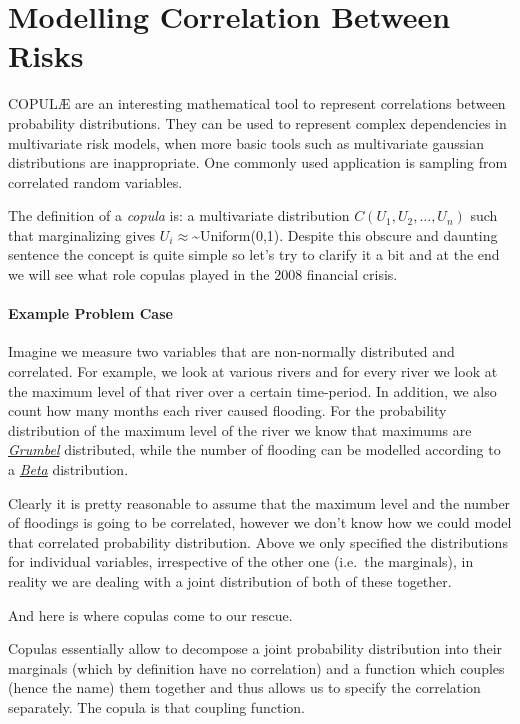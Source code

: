 \chapter{Modelling Correlation Between Risks}

COPULÆ are an interesting mathematical tool to represent correlations between probability distributions. They can be used to represent complex dependencies in multivariate risk models, when more basic tools such as multivariate gaussian distributions are inappropriate. One commonly used application is sampling from correlated random variables.

    The definition of a \emph{copula} is: a multivariate distribution
\(C(U_1, U_2, \ldots, U_n)\) such that marginalizing gives
\(U_i \approx\)\textasciitilde{}Uniform(0,1). Despite this obscure and
daunting sentence the concept is quite simple so let's try to clarify it
a bit and at the end we will see what role copulas played in the 2008
financial crisis.

\hypertarget{example-problem-case}{%
\subsubsection{Example Problem Case}\label{example-problem-case}}

Imagine we measure two variables that are non-normally distributed and
correlated. For example, we look at various rivers and for every river
we look at the maximum level of that river over a certain time-period.
In addition, we also count how many months each river caused flooding.
For the probability distribution of the maximum level of the river we
know that maximums are \href{}{\emph{Grumbel}} distributed, while the
number of flooding can be modelled according to a \href{}{\emph{Beta}}
distribution.

Clearly it is pretty reasonable to assume that the maximum level and the
number of floodings is going to be correlated, however we don't know how
we could model that correlated probability distribution. Above we only
specified the distributions for individual variables, irrespective of
the other one (i.e.~the marginals), in reality we are dealing with a
joint distribution of both of these together.

And here is where copulas come to our rescue.

Copulas essentially allow to decompose a joint probability distribution
into their marginals (which by definition have no correlation) and a
function which couples (hence the name) them together and thus allows us
to specify the correlation separately. The copula is that coupling
function.

